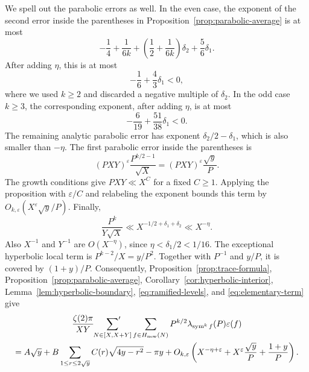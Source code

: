 \documentclass[12pt,reqno]{amsart}
\numberwithin{equation}{section}
\theoremstyle{plain}
\theoremstyle{definition}
\theoremstyle{remark}
\newcommand{\sym}{\operatorname{sym}}
\begin{document}
We spell out the parabolic errors as well.  In the even case, the exponent of the second error inside the parentheses in Proposition~\ref{prop:parabolic-average} is at most
\[
-\frac14+\frac1{6k}
+\left(\frac12+\frac1{6k}\right)\delta_2
+\frac56\delta_1.
\]
After adding $\eta$, this is at most
\[
-\frac16+\frac43\delta_1<0,
\]
where we used $k\geq2$ and discarded a negative multiple of $\delta_2$.
In the odd case $k\geq3$, the corresponding exponent, after adding $\eta$, is at most
\[
-\frac6{19}+\frac{51}{38}\delta_1<0.
\]
The remaining analytic parabolic error has exponent $\delta_2/2-\delta_1$, which is also smaller than $-\eta$.
The first parabolic error inside the parentheses is
\[
(PXY)^\varepsilon\frac{P^{k/2-1}}{\sqrt X}
=(PXY)^\varepsilon\frac{\sqrt y}{P}.
\]
The growth conditions give $PXY\ll X^C$ for a fixed $C\geq1$.
Applying the proposition with $\varepsilon/C$ and relabeling the exponent bounds this term by
$O_{k,\varepsilon}(X^\varepsilon\sqrt y/P)$.
Finally,
\[
\frac{P^k}{Y\sqrt X}
\ll X^{-1/2+\delta_1+\delta_2}
\ll X^{-\eta}.
\]
Also $X^{-1}$ and $Y^{-1}$ are $O(X^{-\eta})$, since $\eta<\delta_1/2<1/16$.
The exceptional hyperbolic local term is $P^{k-2}/X=y/P^2$.
Together with $P^{-1}$ and $y/P$, it is covered by $(1+y)/P$.
Consequently, Proposition~\ref{prop:trace-formula}, Proposition~\ref{prop:parabolic-average}, Corollary~\ref{cor:hyperbolic-interior}, Lemma~\ref{lem:hyperbolic-boundary}, \eqref{eq:ramified-levels}, and \eqref{eq:elementary-term} give
\begin{multline}\label{eq:numerator-asymptotic}
\frac{\zeta(2)\pi}{XY}
\sideset{}{'}\sum_{N\in[X,X+Y]}
\sum_{f\in H_{\mathrm{new}}(N)}
P^{k/2}\lambda_{\sym^k f}(P)\varepsilon(f)
\\
=
A\sqrt y
+
B\sum_{1\leq r\leq2\sqrt y}
C(r)\sqrt{4y-r^2}
-\pi y
+
O_{k,\varepsilon}\left(
X^{-\eta+\varepsilon}
+X^\varepsilon\frac{\sqrt y}{P}
+\frac{1+y}{P}
\right).
\end{multline}
\end{document}
